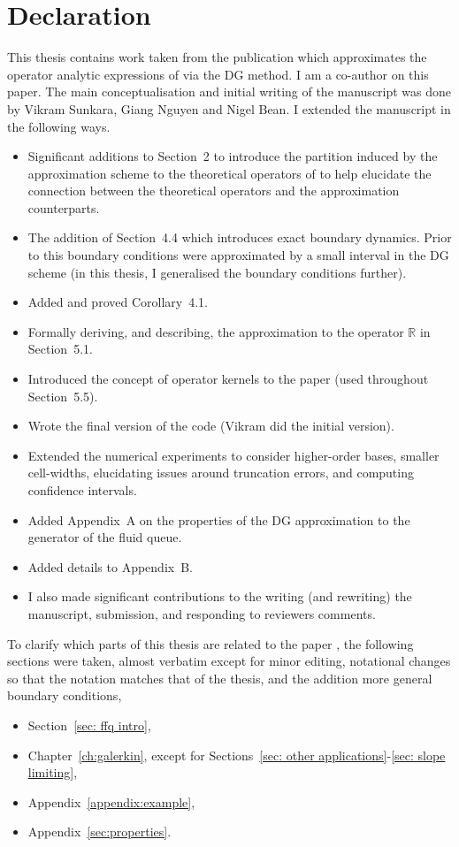 \chapter{Declaration}
\label{ch:declaration}

This thesis contains work taken from the publication \cite{blnos2022} which approximates the operator analytic expressions of \cite{bo2014} via the DG method. I am a co-author on this paper. The main conceptualisation and initial writing of the manuscript was done by Vikram Sunkara, Giang Nguyen and Nigel Bean. I extended the manuscript in the following ways.
\begin{itemize}
    \item Significant additions to Section~2 to introduce the partition induced by the approximation scheme to the theoretical operators of \cite{bo2014} to help elucidate the connection between the theoretical operators and the approximation counterparts. 
    \item The addition of Section~4.4 which introduces exact boundary dynamics. Prior to this boundary conditions were approximated by a small interval in the DG scheme (in this thesis, I generalised the boundary conditions further).
    \item Added and proved Corollary~4.1.
    \item Formally deriving, and describing, the approximation to the operator \(\mathbb R\) in Section~5.1. 
    \item Introduced the concept of operator kernels to the paper (used throughout Section~5.5).
    \item Wrote the final version of the code (Vikram did the initial version).
    \item Extended the numerical experiments to consider higher-order bases, smaller cell-widths, elucidating issues around truncation errors, and computing confidence intervals. 
    \item Added Appendix~A on the properties of the DG approximation to the generator of the fluid queue.
    \item Added details to Appendix~B. 
    \item I also made significant contributions to the writing (and rewriting) the manuscript, submission, and responding to reviewers comments. 
\end{itemize}
To clarify which parts of this thesis are related to the paper \cite{blnos2022}, the following sections were taken, almost verbatim except for minor editing, notational changes so that the notation matches that of the thesis, and the addition more general boundary conditions,
\begin{itemize}
    \item Section~\ref{sec: ffq intro},
    \item Chapter~\ref{ch:galerkin}, except for Sections~\ref{sec: other applications}-\ref{sec: slope limiting},
    \item Appendix~\ref{appendix:example},
    \item Appendix~\ref{sec:properties}.
\end{itemize}